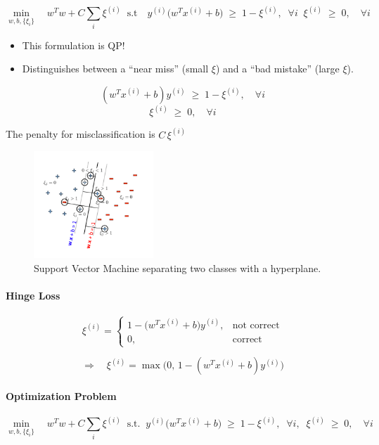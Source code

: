 \documentclass[11pt]{article}
\begin{document}
\[
	\min_{w,b,\{\xi_i\}} \quad w^T w + C \sum_i \xi^{(i)} \; \; \text{s.t} \quad y^{(i)} \big(w^T x^{(i)} + b\big) \;\geq\; 1 - \xi^{(i)}, \; \; \forall i \;\; \xi^{(i)} \;\geq\; 0, \quad \forall i
\]

\begin{itemize}
	\item This formulation is QP!
	\item Distinguishes between a ``near miss'' (small $\xi$) and a ``bad mistake'' (large $\xi$).
\end{itemize}

\[
	(w^T x^{(i)} + b) y^{(i)} \;\geq\; 1 - \xi^{(i)}, \quad \forall i
\]
\[
	\xi^{(i)} \;\geq\; 0, \quad \forall i
\]

The penalty for misclassification is $C \, \xi^{(i)}$

\begin{figure}[h!]
	\centering
	\includegraphics[width=0.4\textwidth]{../imgs/svm2.png}
	\caption{Support Vector Machine separating two classes with a hyperplane.}
\end{figure}

\paragraph*{Hinge Loss}
\[
	\xi^{(i)} =
	\begin{cases}
		1 - \big(w^T x^{(i)} + b\big)y^{(i)}, & \text{not correct} \\[6pt]
		0,                                    & \text{correct}
	\end{cases}
\]

\[
	\Longrightarrow \quad \xi^{(i)} = \max \big(0, \, 1 - (w^T x^{(i)} + b)y^{(i)}\big)
\]

\paragraph*{Optimization Problem}
\[
	\min_{w,b,\{\xi_i\}} \quad w^T w + C \sum_i \xi^{(i)}
	\;\; \text{s.t.} \;\; y^{(i)} \big(w^T x^{(i)} + b\big) \;\geq\; 1 - \xi^{(i)}, \;\; \forall i,
	\;\; \xi^{(i)} \;\geq\; 0, \quad \forall i
\]
\end{document}
